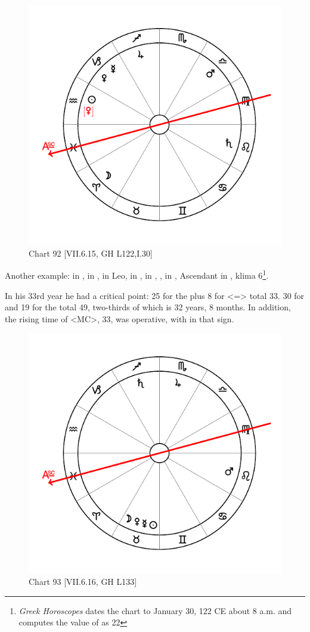 \newpage
\begin{figure}
\centering
\vspace{0pt}
\includegraphics[width=.68\textwidth]{charts/7_6_15}
\caption{Chart 92 [VII.6.15, GH L122,I.30] }
\label{fig:chart92}
\end{figure} 

Another example: \Sun\xspace in \Aquarius, \Moon\xspace in \Aries, \Saturn\xspace in Leo, \Jupiter\xspace in \Sagittarius, \Mars\xspace in \Libra, \Venus, \Mercury\xspace in \Capricorn, Ascendant in \Pisces, klima 6\footnote{\textit{Greek Horoscopes} dates the chart to January 30, 122 CE about 8 a.m. and computes the value of \Venus\xspace as 22 \Aquarius}.

In his 33rd year he had a critical point: 25 for the \Moon\xspace plus 8 for \Libra\xspace <=\Venus> total 33. 30 for \Saturn\xspace and 19 for the \Sun\xspace total 49, two-thirds of which is 32 years, 8 months. In addition, the rising time of \Sagittarius\xspace <MC>, 33, was operative, with \Jupiter\xspace in that sign.

\newpage
\begin{figure}
\centering
\vspace{0pt}
\includegraphics[width=.68\textwidth]{charts/7_6_16}
\caption{Chart 93 [VII.6.16, GH L133] }
\label{fig:chart93}
\end{figure} 

